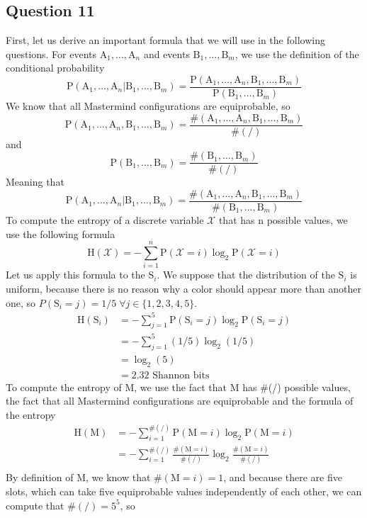 \documentclass{article}
\begin{document}
\subsection*{Question 11}
First, let us derive an important formula that we will use in the following questions. For events $\mbox{A}_1,\dots,\mbox{A}_n$ and events $\mbox{B}_1,\dots,\mbox{B}_m$, we use the definition of the conditional probability
$$
\mbox{P}(\mbox{A}_1,\dots,\mbox{A}_n|\mbox{B}_1,\dots,\mbox{B}_m) = \frac{\mbox{P}(\mbox{A}_1,\dots,\mbox{A}_n,\mbox{B}_1,\dots,\mbox{B}_m)}{\mbox{P}(\mbox{B}_1,\dots,\mbox{B}_m)}
$$
We know that all Mastermind configurations are equiprobable, so
$$
\mbox{P}(\mbox{A}_1,\dots,\mbox{A}_n,\mbox{B}_1,\dots,\mbox{B}_m) = \frac{\#(\mbox{A}_1,\dots,\mbox{A}_n,\mbox{B}_1,\dots,\mbox{B}_m)}{\#(/)}
$$
and
$$
\mbox{P}(\mbox{B}_1,\dots,\mbox{B}_m) = \frac{\#(\mbox{B}_1,\dots,\mbox{B}_m)}{\#(/)}
$$
Meaning that 
$$
\mbox{P}(\mbox{A}_1,\dots,\mbox{A}_n|\mbox{B}_1,\dots,\mbox{B}_m) = \frac{\#(\mbox{A}_1,\dots,\mbox{A}_n,\mbox{B}_1,\dots,\mbox{B}_m)}{\#(\mbox{B}_1,\dots,\mbox{B}_m)}
$$
To compute the entropy of a discrete variable $\mathcal{X}$ that has n possible values, we use the following formula
$$
\mbox{H}(\mathcal{X}) = -\sum_{i=1}^{n} \mbox{P}(\mathcal{X} = i) \log_2\mbox{P}(\mathcal{X} =i)
$$
Let us apply this formula to the $\mbox{S}_i$. We suppose that the distribution of the $\mbox{S}_i$ is uniform, because there is no reason why a color should appear more than another one, so $P(\mbox{S}_i = j) = 1/5\; \forall j \in \{1,2,3,4,5\}$.
\begin{align*}
\mbox{H}(\mbox{S}_i) &= -\sum_{j=1}^{5} \mbox{P}(\mbox{S}_i = j) \log_2\mbox{P}(\mbox{S}_i =j)\\
&= -\sum_{j=1}^{5} (1/5) \log_2(1/5)\\
&=\log_2(5) \\
&=2.32\mbox{ Shannon bits}
\end{align*}
To compute the entropy of M, we use the fact that M has \#(/) possible values, the fact that all Mastermind configurations are equiprobable and the formula of the entropy
\begin{align*}
\mbox{H}(\mbox{M})& = -\sum_{i=1}^{\#(/)}\mbox{P}(\mbox{M} = i)\log_2  \mbox{P}(\mbox{M} = i)\\ &= -\sum_{i=1}^{\#(/)}\frac{\#(\mbox{M} = i)}{\#(/)}\log_2  \frac{\#(\mbox{M} = i)}{\#(/)} \\
\end{align*}
By definition of M, we know that $\#(\mbox{M}=i) = 1$, and because there are five slots, which can take five equiprobable values independently of each other, we can compute that $\#(/)=5^5$, so
\end{document}
